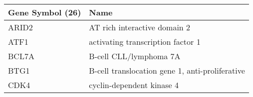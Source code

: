 \begin{tabular}{ll}
\toprule
Gene Symbol (26) &                                            Name \\
\midrule
           ARID2 &                    AT rich interactive domain 2 \\
            ATF1 &               activating transcription factor 1 \\
           BCL7A &                          B-cell CLL/lymphoma 7A \\
            BTG1 & B-cell translocation gene 1, anti-proliferative \\
            CDK4 &                       cyclin-dependent kinase 4 \\
\bottomrule
\end{tabular}
